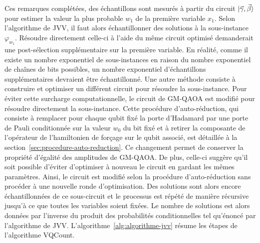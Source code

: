 Ces remarques complétées, des échantillons sont mesurés à partir du circuit $\ket{\vec{\gamma}, \vec{\beta}}$ pour estimer la valeur la plus probable $w_{1}$ de la première variable $x_{1}$. Selon l'algorithme de JVV, il faut alors échantillonner des solutions à la sous-instance $\varphi_{w_{1}}$. Résoudre directement celle-ci à l'aide du même circuit optimisé demanderait une post-sélection supplémentaire sur la première variable. En réalité, comme il existe un nombre exponentiel de sous-instances en raison du nombre exponentiel de chaînes de bits possibles, un nombre exponentiel d'échantillons supplémentaires devraient être échantillonné. Une autre méthode consiste à construire et optimiser un différent circuit pour résoudre la sous-instance. Pour éviter cette surcharge computationnelle, le circuit de GM-QAOA est modifié pour résoudre directement la sous-instance. Cette procédure d'auto-réduction, qui consiste à remplacer pour chaque qubit fixé la porte d'Hadamard par une porte de Pauli conditionnée sur la valeur $w_{0}$ du bit fixé et à retirer la composante de l'opérateur de l'hamiltonien de forçage sur le qubit associé, est détaillée à la section~\ref{sec:procedure-auto-reduction}.
Ce changement permet de conserver la propriété d'égalité des amplitudes de GM-QAOA. De plus, celle-ci suggère qu'il soit possible d'éviter d'optimiser à nouveau le circuit en gardant les mêmes paramètres. Ainsi, le circuit est modifié selon la procédure d'auto-réduction sans procéder à une nouvelle ronde d'optimisation. Des solutions sont alors encore échantillonnées de ce sous-circuit et le processus est répété de manière récursive jusqu'à ce que toutes les variables soient fixées. Le nombre de solutions est alors données par l'inverse du produit des probabilités conditionnelles tel qu'énoncé par l'algorithme de JVV. L'algorithme~\ref{alg:algorithme-jvv} résume les étapes de l'algorithme VQCount.

